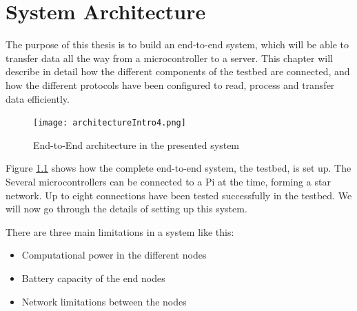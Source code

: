\chapter{System Architecture}
\label{chp:architecture} 

\noindent The purpose of this thesis is to build an end-to-end system, which will be able to transfer data all the way from a \gls{microcontroller} to a server. This chapter will describe in detail how the different components of the testbed are connected, and how the different protocols have been configured to read, process and transfer data efficiently. 

\begin{figure}[ht]
    \centering
    \texttt{[image: architectureIntro4.png]}    
    \caption{End-to-End architecture in the presented system}
    \label{fig:systemArchitectureThisSystem}
\end{figure}


\noindent Figure \ref{fig:systemArchitectureThisSystem} shows how the complete end-to-end system, the testbed, is set up. The Several \glspl{microcontroller} can be connected to a Pi at the time, forming a star network. Up to eight connections have been tested successfully in the testbed. We will now go through the details of setting up this system. 

\newpage
\noindent There are three main limitations in a system like this:

\begin{itemize}
  \item Computational power in the different nodes
  \item Battery capacity of the end nodes
  \item Network limitations between the nodes
\end{itemize}




